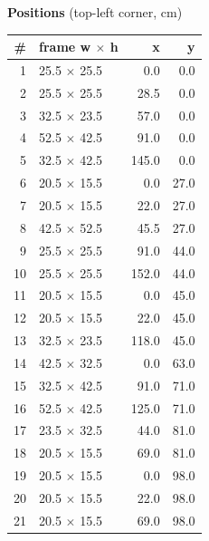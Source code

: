 \documentclass[a4paper,landscape,10pt]{article}
\begin{document}
\begin{minipage}[t]{0.25\textwidth}
\vspace{8pt}
{\bfseries Positions} (top-left corner, cm)\\[2pt]
\tiny
\begin{tabular}{@{}r l r r@{}}
\toprule
\# & frame w $\times$ h & x & y \\
\midrule
1 & 25.5 $\times$ 25.5 & 0.0 & 0.0 \\
2 & 25.5 $\times$ 25.5 & 28.5 & 0.0 \\
3 & 32.5 $\times$ 23.5 & 57.0 & 0.0 \\
4 & 52.5 $\times$ 42.5 & 91.0 & 0.0 \\
5 & 32.5 $\times$ 42.5 & 145.0 & 0.0 \\
6 & 20.5 $\times$ 15.5 & 0.0 & 27.0 \\
7 & 20.5 $\times$ 15.5 & 22.0 & 27.0 \\
8 & 42.5 $\times$ 52.5 & 45.5 & 27.0 \\
9 & 25.5 $\times$ 25.5 & 91.0 & 44.0 \\
10 & 25.5 $\times$ 25.5 & 152.0 & 44.0 \\
11 & 20.5 $\times$ 15.5 & 0.0 & 45.0 \\
12 & 20.5 $\times$ 15.5 & 22.0 & 45.0 \\
13 & 32.5 $\times$ 23.5 & 118.0 & 45.0 \\
14 & 42.5 $\times$ 32.5 & 0.0 & 63.0 \\
15 & 32.5 $\times$ 42.5 & 91.0 & 71.0 \\
16 & 52.5 $\times$ 42.5 & 125.0 & 71.0 \\
17 & 23.5 $\times$ 32.5 & 44.0 & 81.0 \\
18 & 20.5 $\times$ 15.5 & 69.0 & 81.0 \\
19 & 20.5 $\times$ 15.5 & 0.0 & 98.0 \\
20 & 20.5 $\times$ 15.5 & 22.0 & 98.0 \\
21 & 20.5 $\times$ 15.5 & 69.0 & 98.0 \\
\bottomrule
\end{tabular}
\end{minipage}
\clearpage
\end{document}
